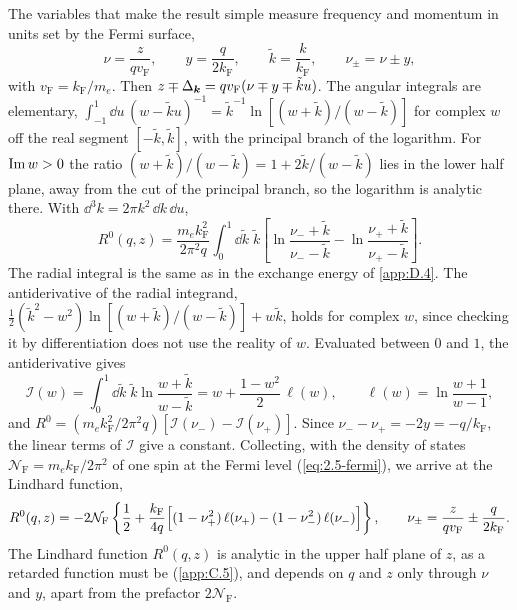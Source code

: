 The variables that make the result simple measure frequency and momentum in units set by the Fermi surface,
\begin{equation*}
  \nu = \frac{z}{qv_{\mathrm{F}}}, \qquad y = \frac{q}{2k_{\mathrm{F}}}, \qquad \tilde{k} = \frac{k}{k_{\mathrm{F}}}, \qquad \nu_\pm = \nu \pm y ,
\end{equation*}
with $v_{\mathrm{F}} = k_{\mathrm{F}}/m_e$. Then $z \mp \Delta_{\bm{k}} = qv_{\mathrm{F}}(\nu \mp y \mp \tilde{k} u)$. The angular integrals are elementary, $\int_{-1}^1\dd u\,(w - \tilde{k} u)^{-1} = \tilde{k}^{-1}\ln[(w + \tilde{k})/(w - \tilde{k})]$ for complex $w$ off the real segment $[-\tilde{k}, \tilde{k}]$, with the principal branch of the logarithm. For $\operatorname{Im} w > 0$ the ratio $(w + \tilde{k})/(w - \tilde{k}) = 1 + 2\tilde{k}/(w - \tilde{k})$ lies in the lower half plane, away from the cut of the principal branch, so the logarithm is analytic there. With $\dd^3k = 2\pi k^2\,\dd k\,\dd u$,
\begin{equation*}
  R^0(q,z) = \frac{m_ek_{\mathrm{F}}^2}{2\pi^2q}\int_0^1\dd\tilde{k}\;\tilde{k}\left[\ln\frac{\nu_- + \tilde{k}}{\nu_- - \tilde{k}} - \ln\frac{\nu_+ + \tilde{k}}{\nu_+ - \tilde{k}}\right] .
\end{equation*}
The radial integral is the same as in the exchange energy of \cref{app:D.4}. The antiderivative of the radial integrand, $\tfrac12(\tilde{k}^2 - w^2)\ln[(w + \tilde{k})/(w - \tilde{k})] + w\tilde{k}$, holds for complex $w$, since checking it by differentiation does not use the reality of $w$. Evaluated between $0$ and $1$, the antiderivative gives
\begin{equation*}
  \mathcal{I}(w) = \int_0^1\dd\tilde{k}\;\tilde{k}\ln\frac{w + \tilde{k}}{w - \tilde{k}} = w + \frac{1 - w^2}{2}\,\ell(w), \qquad \ell(w) = \ln\frac{w + 1}{w - 1} ,
\end{equation*}
and $R^0 = (m_ek_{\mathrm{F}}^2/2\pi^2q)[\mathcal{I}(\nu_-) - \mathcal{I}(\nu_+)]$. Since $\nu_- - \nu_+ = -2y = -q/k_{\mathrm{F}}$, the linear terms of $\mathcal{I}$ give a constant. Collecting, with the density of states $\mathcal{N}_{\mathrm{F}} = m_ek_{\mathrm{F}}/2\pi^2$ of one spin at the Fermi level (\cref{eq:2.5-fermi}), we arrive at the Lindhard function,
\begin{equation}
  R^0(q,z) = -2\mathcal{N}_{\mathrm{F}}\left\{\frac12 + \frac{k_{\mathrm{F}}}{4q}\Bigl[(1 - \nu_+^2)\,\ell(\nu_+) - (1 - \nu_-^2)\,\ell(\nu_-)\Bigr]\right\}, \qquad
  \nu_\pm = \frac{z}{qv_{\mathrm{F}}} \pm \frac{q}{2k_{\mathrm{F}}} .
  \label{eq:D.8-Rz}
\end{equation}
The Lindhard function $R^0(q,z)$ is analytic in the upper half plane of $z$, as a retarded function must be (\cref{app:C.5}), and depends on $q$ and $z$ only through $\nu$ and $y$, apart from the prefactor $2\mathcal{N}_{\mathrm{F}}$.

